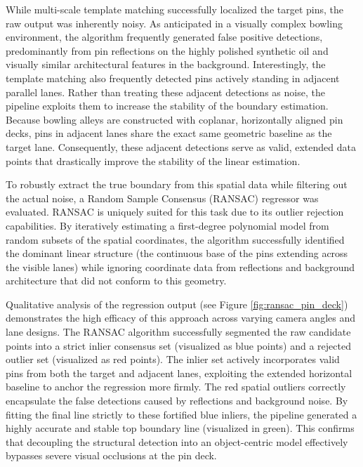 While multi-scale template matching successfully localized the target pins, the raw output was inherently noisy. As anticipated in a visually complex bowling environment, the algorithm frequently generated false positive detections, predominantly from pin reflections on the highly polished synthetic oil and visually similar architectural features in the background. Interestingly, the template matching also frequently detected pins actively standing in adjacent parallel lanes. Rather than treating these adjacent detections as noise, the pipeline exploits them to increase the stability of the boundary estimation. Because bowling alleys are constructed with coplanar, horizontally aligned pin decks, pins in adjacent lanes share the exact same geometric baseline as the target lane. Consequently, these adjacent detections serve as valid, extended data points that drastically improve the stability of the linear estimation.

To robustly extract the true boundary from this spatial data while filtering out the actual noise, a Random Sample Consensus (RANSAC) regressor was evaluated. RANSAC is uniquely suited for this task due to its outlier rejection capabilities. By iteratively estimating a first-degree polynomial model from random subsets of the spatial coordinates, the algorithm successfully identified the dominant linear structure (the continuous base of the pins extending across the visible lanes) while ignoring coordinate data from reflections and background architecture that did not conform to this geometry.

Qualitative analysis of the regression output (see Figure \ref{fig:ransac_pin_deck}) demonstrates the high efficacy of this approach across varying camera angles and lane designs. The RANSAC algorithm successfully segmented the raw candidate points into a strict inlier consensus set (visualized as blue points) and a rejected outlier set (visualized as red points). The inlier set actively incorporates valid pins from both the target and adjacent lanes, exploiting the extended horizontal baseline to anchor the regression more firmly. The red spatial outliers correctly encapsulate the false detections caused by reflections and background noise. By fitting the final line strictly to these fortified blue inliers, the pipeline generated a highly accurate and stable top boundary line (visualized in green). This confirms that decoupling the structural detection into an object-centric model effectively bypasses severe visual occlusions at the pin deck. 


